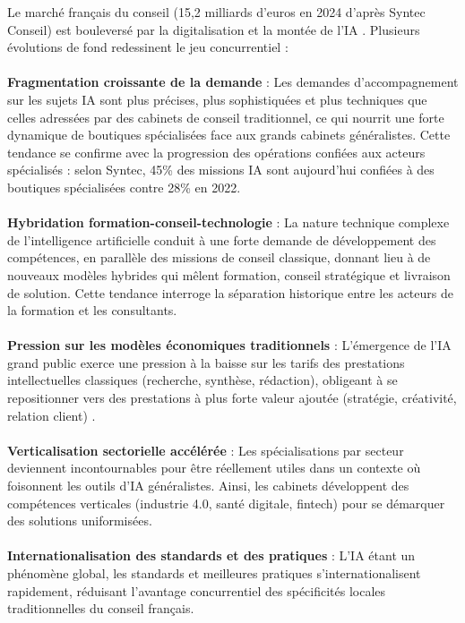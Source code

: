Le marché français du conseil (15,2 milliards d'euros en 2024 d'après Syntec Conseil) est bouleversé par la digitalisation et la montée de l'IA \cite{syntec2024ai}. Plusieurs évolutions de fond redessinent le jeu concurrentiel :
\\\\
\textbf{Fragmentation croissante de la demande} : Les demandes d’accompagnement sur les sujets IA sont plus précises, plus sophistiquées et plus techniques que celles adressées par des cabinets de conseil traditionnel, ce qui nourrit une forte dynamique de boutiques spécialisées face aux grands cabinets généralistes. Cette tendance se confirme avec la progression des opérations confiées aux acteurs spécialisés : selon Syntec, 45\% des missions IA sont aujourd’hui confiées à des boutiques spécialisées contre 28\% en 2022.
\\\\
\textbf{Hybridation formation-conseil-technologie} : La nature technique complexe de l’intelligence artificielle conduit à une forte demande de développement des compétences, en parallèle des missions de conseil classique, donnant lieu à de nouveaux modèles hybrides qui mêlent formation, conseil stratégique et livraison de solution. Cette tendance interroge la séparation historique entre les acteurs de la formation et les consultants.
\\\\
\textbf{Pression sur les modèles économiques traditionnels} : L’émergence de l’IA grand public exerce une pression à la baisse sur les tarifs des prestations intellectuelles classiques (recherche, synthèse, rédaction), obligeant à se repositionner vers des prestations à plus forte valeur ajoutée (stratégie, créativité, relation client) \cite{mckinsey2023consulting_ai}.
\\\\
\textbf{Verticalisation sectorielle accélérée} : Les spécialisations par secteur deviennent incontournables pour être réellement utiles dans un contexte où foisonnent les outils d'IA généralistes. Ainsi, les cabinets développent des compétences verticales (industrie 4.0, santé digitale, fintech) pour se démarquer des solutions uniformisées.
\\\\
\textbf{Internationalisation des standards et des pratiques} : L'IA étant un phénomène global, les standards et meilleures pratiques s'internationalisent rapidement, réduisant l'avantage concurrentiel des spécificités locales traditionnelles du conseil français.

